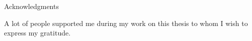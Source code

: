 \begin{center} 


\huge Acknowledgments

\end{center}
A lot of people supported me during my work on this thesis to whom I wish to express my gratitude.

